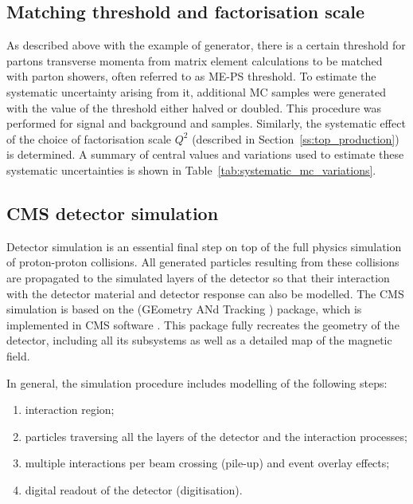 \subsection{Matching threshold and factorisation scale}
\label{ss:matching_and_factorisation}

As described above with the example of \MADGRAPH generator, there is a certain threshold for partons transverse momenta
from matrix element calculations to be matched with parton showers, often referred to as ME-PS threshold. To estimate
the systematic uncertainty arising from it, additional MC samples were generated with the value of the threshold either
halved or doubled. This procedure was performed for signal \ttjets and background \WpJets and \ZpJets samples.
Similarly, the systematic effect of the choice of factorisation scale $Q^2$ (described in
Section~\ref{ss:top_production}) is determined. A summary of central values and variations used to estimate these
systematic uncertainties is shown in Table~\ref{tab:systematic_mc_variations}.



\subsection{CMS detector simulation}
\label{ss:detector_simulation}

Detector simulation is an essential final step on top of the full physics simulation of proton-proton collisions. All
generated particles resulting from these collisions are propagated to the simulated layers of the detector so that their
interaction with the detector material and detector response can also be modelled. The CMS simulation is based on the
\GEANTfour (GEometry ANd Tracking \autocite{GEANT4}) package, which is implemented in CMS software \CMSSW
\autocite{CMSSW}. This package fully recreates the geometry of the detector, including all its subsystems as well as a
detailed map of the magnetic field.

In general, the simulation procedure includes modelling of the following steps:
\begin{enumerate}[label=\textbullet]
  \item interaction region;
  \item particles traversing all the layers of the detector and the interaction processes;
  \item multiple interactions per beam crossing (pile-up) and event overlay effects;
  \item digital readout of the detector (digitisation).
\end{enumerate}

